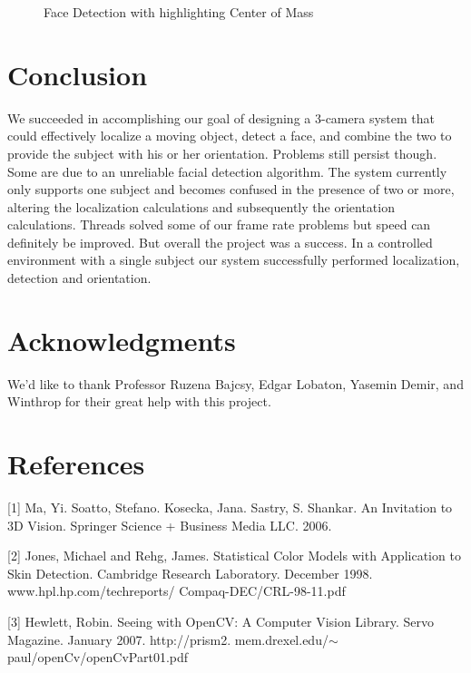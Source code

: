 \documentclass{acm_proc_article-sp}
\begin{document}
	\begin{figure}
		\centering
		\hfill
		\caption{\label{fig:Combined}Face Detection with highlighting Center of Mass}
	\end{figure}
		
\section{Conclusion}
We succeeded in accomplishing our goal of designing a 3-camera system that could effectively localize a moving object, detect a face, and combine the two to provide the subject with his or her orientation. Problems still persist though. Some are due to an unreliable facial detection algorithm. The system currently only supports one subject and becomes confused in the presence of two or more, altering the localization calculations and subsequently the orientation calculations. Threads solved some of our frame rate problems but speed can definitely be improved. But overall the project was a success. In a controlled environment with a single subject our system successfully performed localization, detection and orientation.

\section{Acknowledgments}
We'd like to thank Professor Ruzena Bajcsy, Edgar Lobaton, Yasemin Demir, and Winthrop for their great help with this project.

\section{References}
[1] Ma, Yi. Soatto, Stefano. Kosecka, Jana. Sastry, S. Shankar. An Invitation to 3D Vision. Springer Science + Business Media LLC. 2006.

[2] Jones, Michael and Rehg, James.  Statistical Color Models with Application to Skin Detection. Cambridge Research Laboratory. December 1998. www.hpl.hp.com/techreports/ Compaq-DEC/CRL-98-11.pdf

[3] Hewlett, Robin. Seeing with OpenCV: A Computer Vision Library. Servo Magazine. January 2007. http://prism2. mem.drexel.edu/$\sim$paul/openCv/openCvPart01.pdf
\balancecolumns
\end{document}
